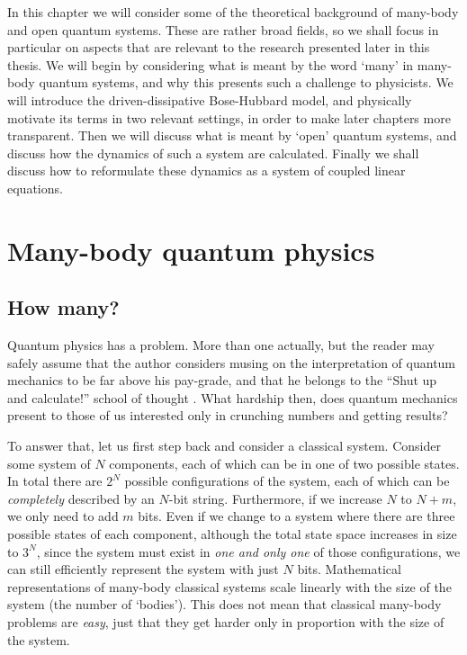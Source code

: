 In this chapter we will consider some of the theoretical background of many-body and open quantum systems. These are rather broad fields, so we shall focus in particular on aspects that are relevant to the research presented later in this thesis. We will begin by considering what is meant by the word `many' in many-body quantum systems, and why this presents such a challenge to physicists. We will introduce the driven-dissipative Bose-Hubbard model, and physically motivate its terms in two relevant settings, in order to make later chapters more transparent. Then we will discuss what is meant by `open' quantum systems, and discuss how the dynamics of such a system are calculated. Finally we shall discuss how to reformulate these dynamics as a system of coupled linear equations.  

\section{Many-body quantum physics}

\subsection{How many?}
Quantum physics has a problem. More than one actually, but the reader may safely assume that the author considers musing on the interpretation of quantum mechanics to be far above his pay-grade, and that he belongs to the ``Shut up and calculate!'' school of thought \cite{Mermin1989}. What hardship then, does quantum mechanics present to those of us interested only in crunching numbers and getting results? 

To answer that, let us first step back and consider a classical system. Consider some system of \(N\) components, each of which can be in one of two possible states. In total there are \(2^{N}\) possible configurations of the system, each of which can be \emph{completely} described by an \(N\)-bit string. Furthermore, if we increase \(N\) to \(N+m\), we only need to add \(m\) bits. Even if we change to a system where there are three possible states of each component, although the total state space increases in size to \(3^{N}\), since the system must exist in \emph{one and only one} of those configurations, we can still efficiently represent the system with just \(N\) bits. Mathematical representations of many-body classical systems scale linearly with the size of the system (the number of `bodies'). This does not mean that classical many-body problems are \emph{easy}, just that they get harder only in proportion with the size of the system.  

